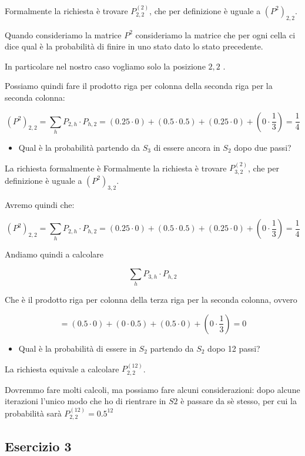 \documentclass{article}
\begin{document}
Formalmente la richiesta è trovare $P_{2,2}^{(2)}$, che per definizione è uguale a $(P^2)_{2,2}$.

Quando consideriamo la matrice $P^2$ consideriamo la matrice che per ogni cella ci dice qual è la probabilità di finire in uno stato dato lo stato precedente.

In particolare nel nostro caso vogliamo solo la posizione $2,2$ .

Possiamo quindi fare il prodotto riga per colonna della seconda riga per la seconda colonna:

\[
(P^2)_{2,2} = \sum_{h} P_{2,h} \cdot P_{h,2} = (0.25 \cdot 0) + (0.5 \cdot 0.5) + (0.25 \cdot 0) + (0 \cdot \frac{1}{3}) = \frac{1}{4}
\]
\pagebreak

\begin{itemize}
	\item Qual è la probabilità partendo da $S_3$ di essere ancora in $S_2$ dopo due passi?
\end{itemize}

La richiesta formalmente è Formalmente la richiesta è trovare $P_{3,2}^{(2)}$, che per definizione è uguale a $(P^2)_{3,2}$.


Avremo quindi che:

\[
(P^2)_{2,2} = \sum_{h} P_{2,h} \cdot P_{h,2} = (0.25 \cdot 0) + (0.5 \cdot 0.5) + (0.25 \cdot 0) + (0 \cdot \frac{1}{3}) = \frac{1}{4}
\]

Andiamo quindi a calcolare

\[
\sum_{h} P_{3,h} \cdot P_{h,2}  
\]

Che è il prodotto riga per colonna della terza riga per la seconda colonna, ovvero

\[
 = (0.5 \cdot 0 ) + (0 \cdot 0.5) + (0.5 \cdot 0) + (0 \cdot \frac{1}{3} ) = 0
\]

\begin{itemize}
	\item Qual è la probabilità di essere in $S_2$ partendo da $S_2$ dopo 12 passi?
\end{itemize}

La richiesta equivale a calcolare $P_{2,2}^{(12)}$.

Dovremmo fare molti calcoli, ma possiamo fare alcuni considerazioni: dopo alcune iterazioni l'unico modo che ho di rientrare in $S2$ è passare da sè stesso, per cui la probabilità sarà $P_{2,2}^{(12)} = 0.5^{12}$

\pagebreak
\subsection{Esercizio 3}
\end{document}
